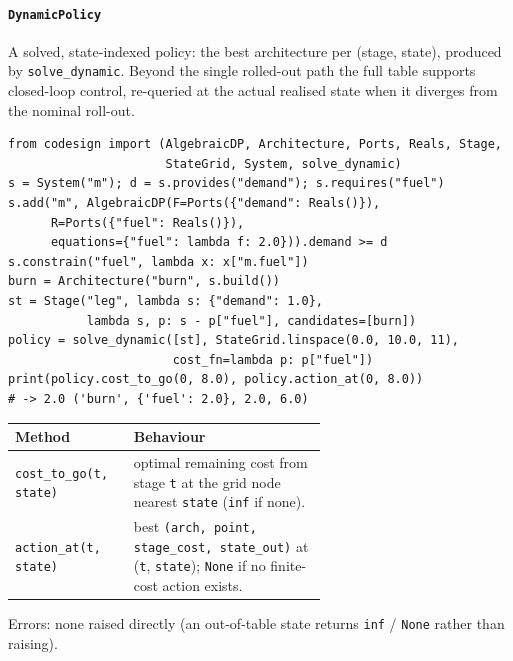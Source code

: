 \documentclass[11pt,a4paper]{article}
\begin{document}
\paragraph{\texttt{DynamicPolicy}}\label{ref:dynamic:dynamicpolicy}
A solved, state-indexed policy: the best architecture per (stage, state),
produced by \texttt{solve\_dynamic}. Beyond the single rolled-out path the
full table supports closed-loop control, re-queried at the actual realised
state when it diverges from the nominal roll-out.
\begin{lstlisting}
from codesign import (AlgebraicDP, Architecture, Ports, Reals, Stage,
                      StateGrid, System, solve_dynamic)
s = System("m"); d = s.provides("demand"); s.requires("fuel")
s.add("m", AlgebraicDP(F=Ports({"demand": Reals()}),
      R=Ports({"fuel": Reals()}),
      equations={"fuel": lambda f: 2.0})).demand >= d
s.constrain("fuel", lambda x: x["m.fuel"])
burn = Architecture("burn", s.build())
st = Stage("leg", lambda s: {"demand": 1.0},
           lambda s, p: s - p["fuel"], candidates=[burn])
policy = solve_dynamic([st], StateGrid.linspace(0.0, 10.0, 11),
                       cost_fn=lambda p: p["fuel"])
print(policy.cost_to_go(0, 8.0), policy.action_at(0, 8.0))
# -> 2.0 ('burn', {'fuel': 2.0}, 2.0, 6.0)
\end{lstlisting}
\begin{center}
\begin{tabular}{@{}lp{0.62\linewidth}@{}}
\toprule
Method & Behaviour \\
\midrule
\texttt{cost\_to\_go(t, state)} & optimal remaining cost from stage
  \texttt{t} at the grid node nearest \texttt{state} (\texttt{inf} if
  none). \\
\texttt{action\_at(t, state)} & best
  \texttt{(arch, point, stage\_cost, state\_out)} at (\texttt{t},
  \texttt{state}); \texttt{None} if no finite-cost action exists. \\
\bottomrule
\end{tabular}
\end{center}
Errors: none raised directly (an out-of-table state returns \texttt{inf} /
\texttt{None} rather than raising).
\end{document}
